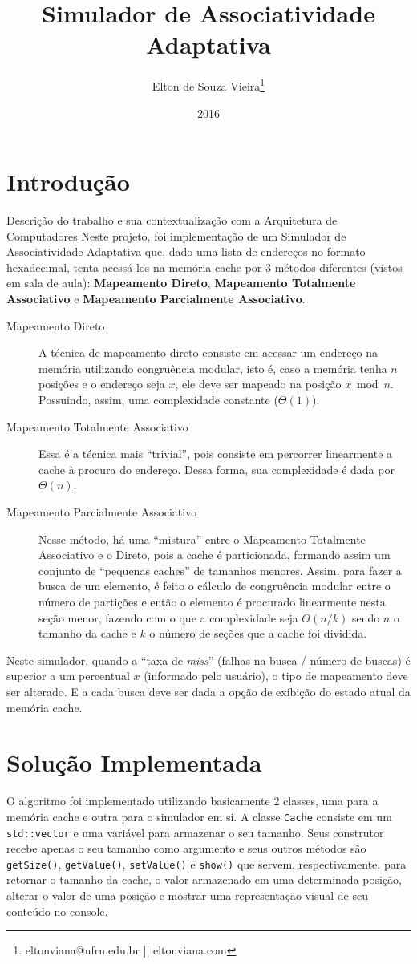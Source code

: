 \documentclass[12pt,openright,oneside,a4paper,english,brazil]{abntex2}
\author{Elton de Souza Vieira\thanks{eltonviana@ufrn.edu.br || eltonviana.com}}
\title{Simulador de Associatividade Adaptativa}
\date{2016}
\newcommand{\code}[1]{\colorbox{codegray}{\texttt{#1}}}
\begin{document}
\imprimircapa

\chapter*{Introdução}
Descrição do trabalho e sua contextualização com a Arquitetura de Computadores
Neste projeto, foi implementação de um Simulador de Associatividade Adaptativa que, dado uma lista de endereços no formato hexadecimal, tenta acessá-los na memória cache por 3 métodos diferentes (vistos em sala de aula): \textbf{Mapeamento Direto}, \textbf{Mapeamento Totalmente Associativo} e \textbf{Mapeamento Parcialmente Associativo}.

\begin{description}
\item[Mapeamento Direto]
A técnica de mapeamento direto consiste em acessar um endereço na memória utilizando congruência modular, isto é, caso a memória tenha $ n $ posições e o endereço seja $ x $, ele deve ser mapeado na posição $ x \bmod n $. Possuindo, assim, uma complexidade constante ($ \Theta (1) $).
\item[Mapeamento Totalmente Associativo]
Essa é a técnica mais ``trivial'', pois consiste em percorrer linearmente a cache à procura do endereço. Dessa forma, sua complexidade é dada por $ \Theta (n) $.
\item[Mapeamento Parcialmente Associativo]
Nesse método, há uma ``mistura'' entre o Mapeamento Totalmente Associativo e o Direto, pois a cache é particionada, formando assim um conjunto de ``pequenas caches'' de tamanhos menores. Assim, para fazer a busca de um elemento, é feito o cálculo de congruência modular entre o número de partições e então o elemento é procurado linearmente nesta seção menor, fazendo com o que a complexidade seja $ \Theta (n/k) $ sendo $ n $ o tamanho da cache e $ k $ o número de seções que a cache foi dividida.
\end{description}

Neste simulador, quando a ``taxa de \textit{miss}'' (falhas na busca / número de buscas) é superior a um percentual $ x $ (informado pelo usuário), o tipo de mapeamento deve ser alterado. E a cada busca deve ser dada a opção de exibição do estado atual da memória cache.

\chapter*{Solução Implementada}
O algoritmo foi implementado utilizando basicamente 2 classes, uma para a memória cache e outra para o simulador em si.
A classe \code{Cache} consiste em um \code{std::vector} e uma variável para armazenar o seu tamanho. Seus construtor recebe apenas o seu tamanho como argumento e seus outros métodos são \code{getSize()}, \code{getValue()}, \code{setValue()} e \code{show()} que servem, respectivamente, para retornar o tamanho da cache, o valor armazenado em uma determinada posição, alterar o valor de uma posição e mostrar uma representação visual de seu conteúdo no console.
\end{document}
